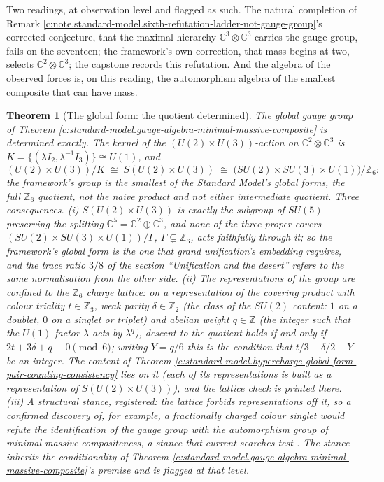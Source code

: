 \documentclass[11pt]{article}
\newtheorem{theorem}{Theorem}[section]
\theoremstyle{definition}
\theoremstyle{plain}
\newcommand{\changedmark}[2]{\marginpar{\raggedright\scriptsize\color{#1}#2}}
\providecommand{\C}{}\renewcommand{\C}{\mathbb{C}}
\begin{document}
\label{c:note.standard-model.setting-gauge-algebra-global-form-2}
Two readings, at observation level and flagged as such. The natural completion of Remark \ref{c:note.standard-model.sixth-refutation-ladder-not-gauge-group}'s corrected conjecture, that the maximal hierarchy $\C^{3} \otimes \C^{3}$ carries the gauge group, fails on the seventeen; the framework's own correction, that mass begins at two, selects $\C^{2} \otimes \C^{3}$; the capstone \cite[Table~1]{ButlerT17} records this refutation. And the algebra of the observed forces is, on this reading, the automorphism algebra of the smallest composite that can have mass.

\begin{theorem}[The global form: the quotient determined]\label{c:standard-model.global-form-quotient-determined}
\changedmark{gray}{reworded}
The global gauge group of Theorem \ref{c:standard-model.gauge-algebra-minimal-massive-composite} is determined exactly. The kernel of the $(U(2) \times U(3))$-action on $\C^{2} \otimes \C^{3}$ is $K = \{(\lambda I_{2}, \lambda^{-1} I_{3})\} \cong U(1)$, and
\begin{equation}
(U(2) \times U(3))/K \;\cong\; S(U(2) \times U(3)) \;\cong\; \bigl(SU(2) \times SU(3) \times U(1)\bigr)/\mathbb{Z}_{6}:
\end{equation}
the framework's group is the smallest of the Standard Model's global forms, the full $\mathbb{Z}_{6}$ quotient, not the naive product and not either intermediate quotient. Three consequences. (i) $S(U(2) \times U(3))$ is exactly the subgroup of $SU(5)$ preserving the splitting $\C^{5} = \C^{2} \oplus \C^{3}$, and none of the three proper covers $(SU(2) \times SU(3) \times U(1))/\Gamma$, $\Gamma \subsetneq \mathbb{Z}_{6}$, acts faithfully through it; so the framework's global form is the one that grand unification's embedding requires, and the trace ratio $3/8$ of the section ``Unification and the desert'' refers to the same normalisation from the other side. (ii) The representations of the group are confined to the $\mathbb{Z}_{6}$ charge lattice: on a representation of the covering product with colour triality $t \in \mathbb{Z}_{3}$, weak parity $\delta \in \mathbb{Z}_{2}$ (the class of the $SU(2)$ content: $1$ on a doublet, $0$ on a singlet or triplet) and abelian weight $q \in \mathbb{Z}$ (the integer such that the $U(1)$ factor $\lambda$ acts by $\lambda^{q}$), descent to the quotient holds if and only if $2t + 3\delta + q \equiv 0 \pmod 6$; writing $Y = q/6$ this is the condition that $t/3 + \delta/2 + Y$ be an integer. The content of Theorem \ref{c:standard-model.hypercharge-global-form-pair-counting-consistency} lies on it (each of its representations is built as a representation of $S(U(2) \times U(3))$), and the lattice check is printed there. (iii) A structural stance, registered: the lattice forbids representations off it, so a confirmed discovery of, for example, a fractionally charged colour singlet would refute the identification of the gauge group with the automorphism group of minimal massive compositeness, a stance that current searches test \cite{PDG2024}. The stance inherits the conditionality of Theorem \ref{c:standard-model.gauge-algebra-minimal-massive-composite}'s premise and is flagged at that level.
\end{theorem}
\end{document}
